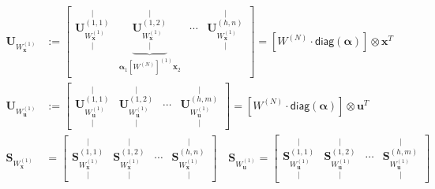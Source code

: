\documentclass[a4paper, 12pt]{scrartcl}
\begin{document}
\begin{align*}
    \bm{U}_{W_{\bm{x}}^{(1)}} 
    &:=
    \begin{bmatrix}
        \overset{\vert}{\underset{\vert}{\bm{U}_{W_{\bm{x}}^{(1)}}^{(1,1)}}} 
        &
        \underbrace{
            \overset{\vert}{\underset{\vert}{\bm{U}_{W_{\bm{x}}^{(1)}}^{(1,2)}}}
        }_{
            \bm{\alpha}_1 
            \left[W^{(N)}\right]^{(1)}
            \bm{x}_2
        }
        &
        \cdots
        &
        \overset{\vert}{\underset{\vert}{\bm{U}_{W_{\bm{x}}^{(1)}}^{(h,n)}}} 
    \end{bmatrix}
    =
    \left[W^{(N)} \cdot \mathsf{diag}(\bm{\alpha})\right] \otimes \bm{x}^T
    \\
    \bm{U}_{W_{\bm{u}}^{(1)}} 
    &:=
    \begin{bmatrix}
        \overset{\vert}{\underset{\vert}{\bm{U}_{W_{\bm{u}}^{(1)}}^{(1,1)}}} 
        &
        \overset{\vert}{\underset{\vert}{\bm{U}_{W_{\bm{u}}^{(1)}}^{(1,2)}}}
        &
        \cdots
        &
        \overset{\vert}{\underset{\vert}{\bm{U}_{W_{\bm{u}}^{(1)}}^{(h,m)}}} 
    \end{bmatrix}
    =
    \left[W^{(N)} \cdot \mathsf{diag}(\bm{\alpha})\right] \otimes \bm{u}^T
    \\
    \bm{S}_{W_{\bm{x}}^{(1)}} 
    &=
    \begin{bmatrix}
        \overset{\vert}{\underset{\vert}{\bm{S}_{W_{\bm{x}}^{(1)}}^{(1,1)}}} 
        &
        \overset{\vert}{\underset{\vert}{\bm{S}_{W_{\bm{x}}^{(1)}}^{(1,2)}}}
        &
        \cdots
        &
        \overset{\vert}{\underset{\vert}{\bm{S}_{W_{\bm{x}}^{(1)}}^{(h,n)}}} 
    \end{bmatrix}
    \quad
    \bm{S}_{W_{\bm{u}}^{(1)}} 
    =
    \begin{bmatrix}
        \overset{\vert}{\underset{\vert}{\bm{S}_{W_{\bm{u}}^{(1)}}^{(1,1)}}} 
        &
        \overset{\vert}{\underset{\vert}{\bm{S}_{W_{\bm{u}}^{(1)}}^{(1,2)}}}
        &
        \cdots
        &
        \overset{\vert}{\underset{\vert}{\bm{S}_{W_{\bm{u}}^{(1)}}^{(h,m)}}} 
    \end{bmatrix}
\end{align*}
\end{document}
